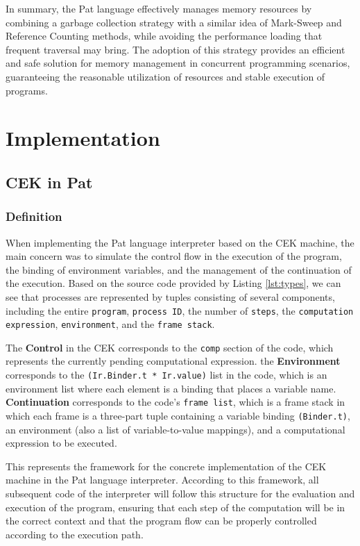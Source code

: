 \documentclass{l4proj}
\begin{document}
In summary, the Pat language effectively manages memory resources by combining a garbage collection strategy with a similar idea of Mark-Sweep and Reference Counting methods, while avoiding the performance loading that frequent traversal may bring. The adoption of this strategy provides an efficient and safe solution for memory management in concurrent programming scenarios, guaranteeing the reasonable utilization of resources and stable execution of programs.




\chapter{Implementation}


\section{CEK in Pat}
\subsection{Definition}
When implementing the Pat language interpreter based on the CEK machine, the main concern was to simulate the control flow in the execution of the program, the binding of environment variables, and the management of the continuation of the execution. Based on the source code provided by Listing \ref{lst:types}, we can see that processes are represented by tuples consisting of several components, including the entire \texttt{program}, \texttt{process ID}, the number of \texttt{steps}, the \texttt{computation expression}, \texttt{environment}, and the \texttt{frame stack}.

The \textbf{Control} in the CEK corresponds to the \texttt{comp} section of the code, which represents the currently pending computational expression. the \textbf{Environment} corresponds to the \texttt{(Ir.Binder.t * Ir.value)} list in the code, which is an environment list where each element is a binding that places a variable name. \textbf{Continuation} corresponds to the code's \texttt{frame list}, which is a frame stack in which each frame is a three-part tuple containing a variable binding \texttt{(Binder.t)}, an environment (also a list of variable-to-value mappings), and a computational expression to be executed. 

This represents the framework for the concrete implementation of the CEK machine in the Pat language interpreter. According to this framework, all subsequent code of the interpreter will follow this structure for the evaluation and execution of the program, ensuring that each step of the computation will be in the correct context and that the program flow can be properly controlled according to the execution path.
\end{document}
